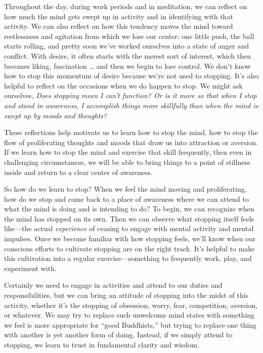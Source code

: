 Throughout the day, during work periods and in meditation, we can 
reflect on how much the mind gets swept up in activity and in 
identifying with that activity. We can also reflect on how this 
tendency moves the mind toward restlessness and agitation from which we 
lose our center: one little push, the ball starts rolling, and pretty 
soon we've worked ourselves into a state of anger and conflict. With 
desire, it often starts with the merest sort of interest, which then 
becomes liking, fascination \ldots{} and then we begin to lose control. 
We don't know how to stop this momentum of desire because we're not 
used to stopping. It's also helpful to reflect on the occasions when we 
do happen to stop. We might ask ourselves, \emph{Does stopping mean I 
can't function? Or is it more so that when I stop and stand in 
awareness, I accomplish things more skillfully than when the mind is 
swept up by moods and thoughts?}

These reflections help motivate us to learn how to stop the mind, how 
to stop the flow of proliferating thoughts and moods that draw us into 
attraction or aversion. If we learn how to stop the mind and exercise 
that skill frequently, then even in challenging circumstances, we will 
be able to bring things to a point of stillness inside and return to a 
clear center of awareness.

So how do we learn to stop? When we feel the mind moving and 
proliferating, how do we stop and come back to a place of awareness 
where we can attend to what the mind is doing and is intending to do? 
To begin, we can recognize when the mind has stopped on its own. Then 
we can observe what stopping itself feels like---the actual 
\emph{experience} of ceasing to engage with mental activity and mental 
impulses. Once we become familiar with how stopping feels, we'll know 
when our conscious efforts to cultivate stopping are on the right 
track. It's helpful to make this cultivation into a regular 
exercise---something to frequently work, play, and experiment with.

Certainly we need to engage in activities and attend to our duties and 
responsibilities, but we can bring an attitude of stopping into the 
midst of this activity, whether it's the stopping of obsession, worry, 
fear, competition, aversion, or whatever. We may try to replace such 
unwelcome mind states with something we feel is more appropriate for 
``good Buddhists,'' but trying to replace one thing with another is yet 
another form of doing. Instead, if we simply attend to stopping, we 
learn to trust in fundamental clarity and wisdom.

